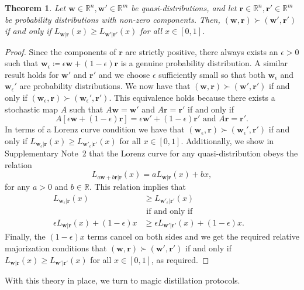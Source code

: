\documentclass[
onecolumn,
superscriptaddress
]{revtex4-1}
\newtheorem{theorem}{Theorem}
\def\r{\boldsymbol{r}}
\def\w{\boldsymbol{w}}
\begin{document}
\begin{theorem}\label{thm:lcquasi}
	Let $\w \in \mathbb{R}^n,\w'\in \mathbb{R}^m$ be quasi-distributions, and let $\r \in \mathbb{R}^n, \r' \in \mathbb{R}^m$ be probability distributions with non-zero components. Then, $(\w, \r) \succ (\w', \r')$ if and only if $L_{\w|\r}(x) \ge L_{\w' |\r'}(x)$ for all $x \in [0,1]$.
\end{theorem}
\begin{proof}
	Since the components of $\r$ are strictly positive, there always exists an $\epsilon >0$ such that $\w_\epsilon \coloneqq \epsilon \w + (1-\epsilon) \r$ is a genuine probability distribution. A similar result holds for $\w'$ and $\r'$ and we choose $\epsilon$ sufficiently small so that both $\w_\epsilon$ and $\w_\epsilon'$ are probability distributions. We now have that $(\w, \r) \succ (\w', \r')$ if and only if $(\w_\epsilon , \r) \succ (\w_\epsilon', \r')$. This equivalence holds because there exists a stochastic map $A$ such that $A \w = \w'$ and $A \r = \r'$ if and only if 
\begin{equation}
A[\epsilon \w + (1-\epsilon) \r] = \epsilon \w' + (1-\epsilon) \r'\mbox{ and } A\r = \r'.
\end{equation}
In terms of a Lorenz curve condition we have that $(\w_\epsilon , \r) \succ (\w_\epsilon', \r')$ if and only if $L_{\w_\epsilon |\r} (x) \ge L_{\w'_\epsilon |\r'} (x)$ for all $x \in [0,1]$. 
Additionally, we show in Supplementary Note~2 that the Lorenz curve for any quasi-distribution obeys the relation
\begin{equation}
L_{a \w + b \r | \r} (x) = a L_{\w|\r} (x) + bx,
\end{equation}
for any $a >0$ and $b \in \mathbb{R}$. This relation implies that
\begin{align*}
L_{\w_\epsilon |\r} (x) &\ge L_{\w'_\epsilon |\r'} (x) \nonumber \\ 
&\mbox{ if and only if }& \\
\epsilon L_{\w |\r} (x) + (1-\epsilon) x &\ge \epsilon L_{\w' |\r'} (x) + (1-\epsilon) x.
\end{align*}
Finally, the $(1-\epsilon)x$ terms cancel on both sides and we get the required relative majorization conditions that $(\w, \r) \succ (\w', \r')$ if and only if $L_{\w | \r} (x) \ge L_{\w' | \r'}(x)$ for all $x \in [0,1]$, as required.
\end{proof}

With this theory in place, we turn to magic distillation protocols.
\end{document}
